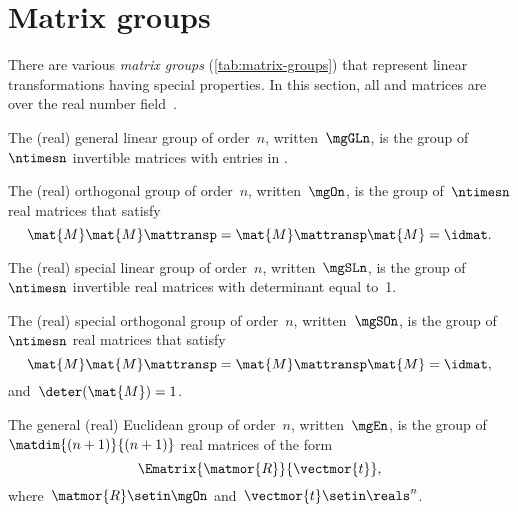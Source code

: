 
\section{Matrix groups}
\label{sec:matrix-grps}


There are various \emph{matrix groups} (\cref{tab:matrix-groups}) that represent linear transformations having special properties.
In this section, all  and matrices are over the real number field~\reals.

\begin{definition}
    \label{def:general-linear-group}
    The (real) general linear group of order~$n$, written~$\mgGLn$, is the group of $\ntimesn$ invertible matrices with entries in \reals.
\end{definition}

\begin{definition}
    \label{def:general-orthogonal-group}
    The (real) orthogonal group of order~$n$, written~$\mgOn$, is the group of~$\ntimesn$ real matrices that satisfy
    \begin{equation}
        \mat{M} \mat{M}\mattransp = \mat{M}\mattransp \mat{M} = \idmat.
    \end{equation}
\end{definition}

\begin{definition}
    \label{def:special-linear-group}
    The (real) special linear group of order~$n$, written~$\mgSLn$, is the group of~$\ntimesn$ invertible real matrices with determinant equal to~1.
\end{definition}
\begin{definition}
    \label{def:special-orthogonal-group}
    The (real) special orthogonal group of order~$n$, written~$\mgSOn$, is the group of~$\ntimesn$ real matrices that satisfy
    \begin{equation}
        \mat{M} \mat{M}\mattransp = \mat{M}\mattransp \mat{M} = \idmat,
    \end{equation}
    and~$\deter(\mat{M}) = 1$.
\end{definition}

\begin{definition}
    \label{def:general-euclidean-group}
    The general (real) Euclidean group of order~$n$, written~$\mgEn$, is the group of~$\matdim{(n+1)}{(n+1)}$ real matrices of the form
    \begin{equation}
        \label{eq:En-def}
        \Ematrix{\matmor{R}}{\vectmor{t}},
    \end{equation}
    where~$\matmor{R}\setin \mgOn$ and~$\vectmor{t} \setin \reals^n$.
\end{definition}

